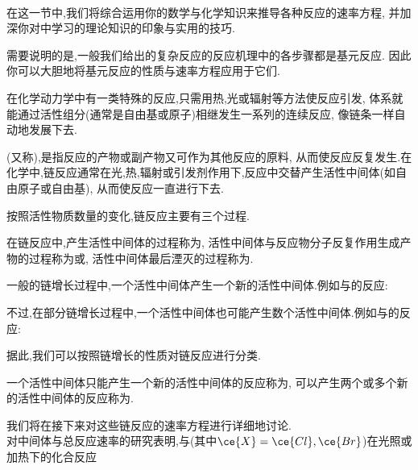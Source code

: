 \documentclass{ctexart}
\begin{document}
\pagestyle{plain}
\noindent{}\vspace{15pt}\\
\indent 在这一节中,我们将综合运用你的数学与化学知识来推导各种反应的速率方程,%
并加深你对中学习的理论知识的印象与实用的技巧.
\begin{hint}
    需要说明的是,一般我们给出的复杂反应的反应机理中的各步骤都是基元反应.%
    因此你可以大胆地将基元反应的性质与速率方程应用于它们.
\end{hint}\vspace{8pt}
\indent 在化学动力学中有一类特殊的反应,只需用热,光或辐射等方法使反应引发,%
体系就能通过活性组分(通常是自由基或原子)相继发生一系列的连续反应,%
像链条一样自动地发展下去.
\begin{definition}[7D.1.1 链反应]
    (又称),是指反应的产物或副产物又可作为其他反应的原料,%
    从而使反应反复发生.在化学中,链反应通常在光,热,辐射或引发剂作用下,反应中交替产生活性中间体(如自由原子或自由基),%
    从而使反应一直进行下去.
\end{definition}
按照活性物质数量的变化,链反应主要有三个过程.
\begin{definition}[7D.1.2 链反应的过程]
    在链反应中,产生活性中间体的过程称为,%
    活性中间体与反应物分子反复作用生成产物的过程称为或,%
    活性中间体最后湮灭的过程称为.
\end{definition}
一般的链增长过程中,一个活性中间体产生一个新的活性中间体.例如与的反应:
\begin{tightcenter}
\end{tightcenter}
不过,在部分链增长过程中,一个活性中间体也可能产生数个活性中间体.例如与的反应:
\begin{tightcenter}
\end{tightcenter}
据此,我们可以按照链增长的性质对链反应进行分类.
\begin{definition}[7D.1.3 直链反应与支链反应]
    一个活性中间体只能产生一个新的活性中间体的反应称为,%
    可以产生两个或多个新的活性中间体的反应称为.
\end{definition}
我们将在接下来对这些链反应的速率方程进行详细地讨论.\vspace{4pt}\\
\indent 对中间体与总反应速率的研究表明,与(其中$\ce{X}=\ce{Cl},\ce{Br}$)在光照或加热下的化合反应%
\end{document}
